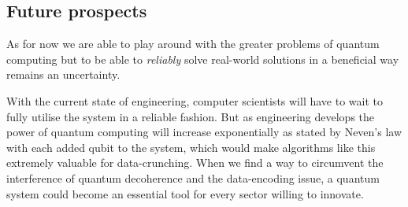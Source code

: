 \subsection{Future prospects}

As for now we are able to play around with the greater problems of quantum computing but to be able to \textit{reliably} solve real-world solutions in a beneficial way remains an uncertainty.

With the current state of engineering, computer scientists will have to wait to fully utilise the system in a reliable fashion. But as engineering develops the power of quantum computing will increase exponentially as stated by Neven's law \autocite{Hartnett2019} with each added qubit to the system, which would make algorithms like this extremely valuable for data-crunching. When we find a way to circumvent the interference of quantum decoherence and the data-encoding issue, a quantum system could become an essential tool for every sector willing to innovate. 


